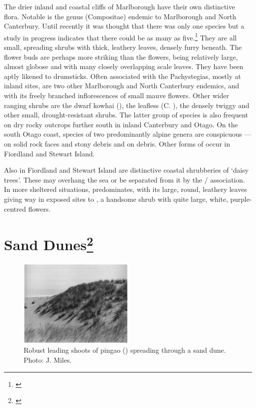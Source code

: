 The drier inland and coastal cliffs of Marlborough have their own distinctive flora.
Notable is the genus  (Compositae) endemic to Marlborough and North Canterbury.
Until recently it was thought that there was only one species but a study in progress indicates that there could be as many as five.\footnote{\cite{molloy1980taxonomy}}
They are all small, spreading shrubs with thick, leathery leaves, densely furry beneath.
The flower buds are perhaps more striking than the flowers, being relatively large, almost globose and with many closely overlapping scale leaves.
They have been aptly likened to drumsticks.
Often associated with the Pachystegias, mostly at inland sites, are two other Marlborough and North Canterbury endemics,  and  with its freely branched inflorescences of small mauve flowers.
Other wider ranging shrubs are the dwarf kowhai (), the leafless  (C. ), the densely twiggy  and other small, drought-resistant shrubs.
The latter group of species is also frequent on dry rocky outcrops further south in inland Canterbury and Otago.
On the south Otago coast, species of two predominantly alpine genera are conspicuous ---  on solid rock faces and stony debris and  on debris.
Other forms of  occur in Fiordland and Stewart Island.

Also in Fiordland and Stewart Island are distinctive coastal shrubberies of `daisy trees'.
These may overhang the sea or be separated from it by the  /  association.
In more sheltered situations,  predominates, with its large, round, leathery leaves giving way in exposed sites to , a handsome shrub with quite large, white, purple-centred flowers.

\section[Sand Dunes]{Sand Dunes\footnote{\cite{moore1963plants}}}

\begin{figure}
	\includegraphics[width=0.5\textwidth]{graphics/figure88pingao.jpg}
	\centering
	\caption[Robust leading shoots of pingao]{Robust leading shoots of pingao () spreading through a sand dune.
	Photo: J. Miles.}%
	\label{fig:88pingao}
\end{figure}

